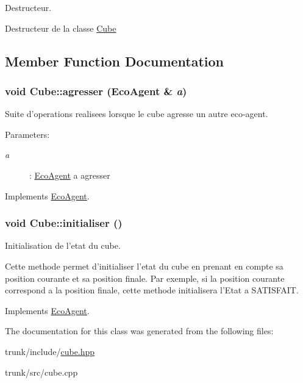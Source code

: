 Destructeur. 

Destructeur de la classe \hyperlink{classCube}{Cube} 

\subsection{Member Function Documentation}
\hypertarget{classCube_85556598281efcfa925dd4ef4c8acba5}{
\subsubsection[{agresser}]{\setlength{\rightskip}{0pt plus 5cm}void Cube::agresser ({\bf EcoAgent} \& {\em a})}}
\label{classCube_85556598281efcfa925dd4ef4c8acba5}


Suite d'operations realisees lorsque le cube agresse un autre eco-agent. 

\begin{Desc}
\item[Parameters:]
\begin{description}
\item[{\em a}]: \hyperlink{classEcoAgent}{EcoAgent} a agresser \end{description}
\end{Desc}


Implements \hyperlink{classEcoAgent_867f0c274eb3ed0b61cb1fe7baa67edd}{EcoAgent}.\hypertarget{classCube_6687c2575f4ce927f6b3032fb46040eb}{
\subsubsection[{initialiser}]{\setlength{\rightskip}{0pt plus 5cm}void Cube::initialiser ()}}
\label{classCube_6687c2575f4ce927f6b3032fb46040eb}


Initialisation de l'etat du cube. 

Cette methode permet d'initialiser l'etat du cube en prenant en compte sa position courante et sa position finale. Par exemple, si la position courante correspond a la position finale, cette methode initialisera l'Etat a SATISFAIT. 

Implements \hyperlink{classEcoAgent_f779fd214bed010d0f6b7b137fde7116}{EcoAgent}.

The documentation for this class was generated from the following files:\begin{CompactItemize}
\item 
trunk/include/\hyperlink{cube_8hpp}{cube.hpp}\item 
trunk/src/cube.cpp\end{CompactItemize}
